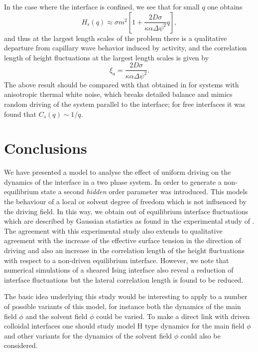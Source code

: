In the case where the interface is confined, we see that for small $q$ one obtains
\begin{equation}
    H_s(q) \approx \sigma m^2 \left[ 1+ \frac{2D\sigma }{\kappa\alpha \Delta\psi^2}q\right],
\end{equation}
and thus at the largest length scales of the problem there is a qualitative departure from capillary wave behavior induced by activity, and the correlation length of height fluctuations at the largest length scales is given by
\begin{equation}
    \xi_a = \frac{2D\sigma }{\kappa\alpha \Delta\psi^2}.
\end{equation}
The above result should be compared with that obtained in \cite{zia1991} for 
systems with anisotropic thermal white noise, which breaks detailed balance and mimics random driving of the system parallel to the interface; for free interfaces it was found that $C_s(q)\sim 1/q$.

    \section{Conclusions}
We have presented a model to analyse the effect of uniform driving on the dynamics of the interface in a two phase system. In order to generate a non-equilibrium state a second {\em hidden} order parameter was introduced. This models the behaviour of a local or solvent degree of freedom which is not influenced by the driving field. In this way, we obtain out of equilibrium interface fluctuations which are described by Gaussian statistics as found in the experimental study of \cite{derks2006}. The agreement with this experimental study also extends to qualitative agreement with the increase of the effective surface tension in the direction of driving and also an increase in the correlation length of the height fluctuations with respect to a non-driven equilibrium interface. However, we  note that numerical simulations of a sheared Ising interface \cite{smith2008,smith2010} also reveal a reduction of interface fluctuations but the lateral correlation length is found to be reduced.

The basic idea underlying this study would be interesting to apply to a number of possible variants of this model, for instance both the dynamics
of the main field $\phi$ and the solvent field $\phi$ could be varied. To make a direct link with driven colloidal interfaces one should study model H type dynamics for the main field $\phi$ and other variants for the dynamics of the 
solvent field $\phi$ could also be considered. 

